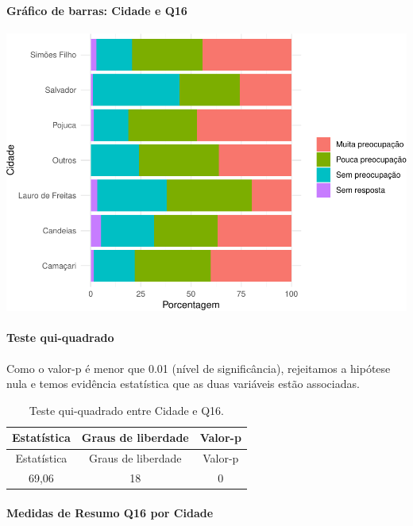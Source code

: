 \documentclass[]{article}
\let\oldparagraph\paragraph
\renewcommand{\paragraph}[1]{\oldparagraph{#1}\mbox{}}
\begin{document}
\hypertarget{gruxe1fico-de-barras-cidade-e-q16}{%
\paragraph{Gráfico de barras: Cidade e Q16}\label{gruxe1fico-de-barras-cidade-e-q16}}

\begin{center}\includegraphics[width=0.75\linewidth]{relatorio_covid19_files/figure-latex/unnamed-chunk-131-1} \end{center}

\hypertarget{teste-qui-quadrado-12}{%
\paragraph{Teste qui-quadrado}\label{teste-qui-quadrado-12}}

Como o valor-p é menor que 0.01 (nível de significância), rejeitamos a hipótese nula e temos evidência estatística que as duas variáveis estão associadas.

\begin{longtable}[]{@{}ccc@{}}
\caption{\label{tab:unnamed-chunk-133}Teste qui-quadrado entre Cidade e Q16.}\tabularnewline
\toprule
Estatística & Graus de liberdade & Valor-p\tabularnewline
\midrule
\endfirsthead
\toprule
Estatística & Graus de liberdade & Valor-p\tabularnewline
\midrule
\endhead
69,06 & 18 & 0\tabularnewline
\bottomrule
\end{longtable}

\cleardoublepage

\hypertarget{medidas-de-resumo-q16-por-cidade}{%
\paragraph{Medidas de Resumo Q16 por Cidade}\label{medidas-de-resumo-q16-por-cidade}}
\end{document}
